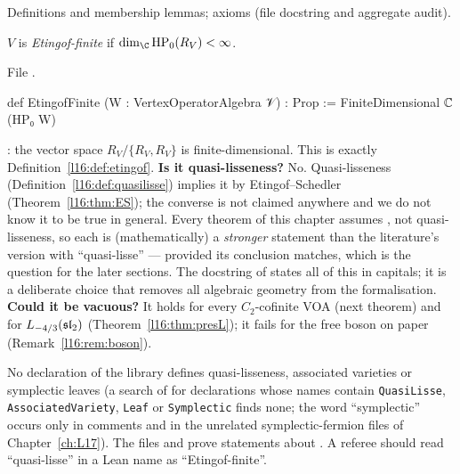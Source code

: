 \begin{status}
Definitions and membership lemmas; axioms \lean{[propext, Classical.}\allowbreak{}\allowbreak\lean{sound]} (file docstring and
aggregate audit).
\end{status}

\begin{definition}\label{l16:def:etingof}
$V$ is \emph{Etingof-finite} if $\dim_\C\lsixteenHP(R_V)<\infty$.
\end{definition}
\noindent File .
\begin{leancode}
def EtingofFinite (W : VertexOperatorAlgebra 𝒱) : Prop := FiniteDimensional ℂ (HP₀ W)
\end{leancode}

\begin{dictionary}
: the vector space $R_V/\{R_V,R_V\}$ is finite-dimensional. This is exactly
Definition~\ref{l16:def:etingof}. \textbf{Is it quasi-lisseness?} No. Quasi-lisseness
(Definition~\ref{l16:def:quasilisse}) implies it by Etingof--Schedler (Theorem~\ref{l16:thm:ES}); the converse is
not claimed anywhere and we do not know it to be true in general. Every theorem of this chapter assumes
, not quasi-lisseness, so each is (mathematically) a \emph{stronger} statement than the
literature's version with ``quasi-lisse'' --- provided its conclusion matches, which is the question for the
later sections. The docstring of  states all of this in capitals; it is a deliberate
choice that removes all algebraic geometry from the formalisation. \textbf{Could it be vacuous?} It holds for
every $C_2$-cofinite VOA (next theorem) and for $L_{-4/3}(\mathfrak{sl}_2)$ (Theorem~\ref{l16:thm:presL}); it fails
for the free boson on paper (Remark~\ref{l16:rem:boson}).
\end{dictionary}

\begin{warning}[title={``Quasi-lisse'' is a file name, not a definition}]
No declaration of the library defines quasi-lisseness, associated varieties or symplectic leaves (a search of
 for declarations whose names contain \texttt{QuasiLisse}, \texttt{AssociatedVariety},
\texttt{Leaf} or \texttt{Symplectic} finds none; the word ``symplectic'' occurs only in comments and in the
unrelated symplectic-fermion files of Chapter~\ref{ch:L17}). The
files  and  prove statements about
. A referee should read ``quasi-lisse'' in a Lean name as ``Etingof-finite''.
\end{warning}

